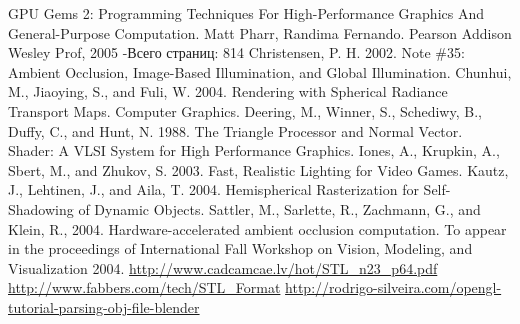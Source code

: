 









\clearpage
\begin{thebibliography}{00}
 GPU Gems 2: Programming Techniques For High-Performance Graphics And General-Purpose Computation. Matt Pharr, Randima Fernando. Pearson Addison Wesley Prof, 2005  -Всего страниц: 814
 Christensen, P. H. 2002. Note \#35: Ambient Occlusion, Image-Based Illumination, and Global Illumination.
 Chunhui, M., Jiaoying, S., and Fuli, W. 2004. Rendering with Spherical Radiance Transport Maps. Computer Graphics.
 Deering, M., Winner, S., Schediwy, B., Duffy, C., and Hunt, N. 1988. The Triangle Processor and Normal Vector. Shader: A VLSI System for High Performance Graphics.
 Iones, A., Krupkin, A., Sbert, M., and Zhukov, S. 2003. Fast, Realistic Lighting for Video Games.
 Kautz, J., Lehtinen, J., and Aila, T.  2004.  Hemispherical Rasterization for Self-Shadowing of Dynamic Objects.
 Sattler, M., Sarlette, R., Zachmann, G., and Klein, R., 2004. Hardware-accelerated ambient occlusion computation. To appear in the proceedings of International Fall Workshop on Vision, Modeling, and Visualization 2004.
 \url{http://www.cadcamcae.lv/hot/STL_n23_p64.pdf}
 \url{http://www.fabbers.com/tech/STL_Format}
 \url{http://rodrigo-silveira.com/opengl-tutorial-parsing-obj-file-blender}
\end{thebibliography}




